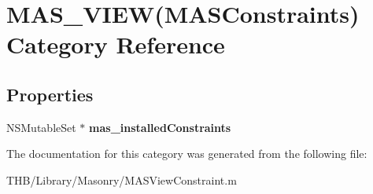 \hypertarget{category_m_a_s___v_i_e_w_07_m_a_s_constraints_08}{}\section{M\+A\+S\+\_\+\+V\+I\+EW(M\+A\+S\+Constraints) Category Reference}
\label{category_m_a_s___v_i_e_w_07_m_a_s_constraints_08}
\subsection*{Properties}
\begin{DoxyCompactItemize}
\item 
\mbox{\label{category_m_a_s___v_i_e_w_07_m_a_s_constraints_08_a29bbe10e9ba5b1f0294f7fe28c8ae144}} 
N\+S\+Mutable\+Set $\ast$ {\bfseries mas\+\_\+installed\+Constraints}
\end{DoxyCompactItemize}


The documentation for this category was generated from the following file\+:\begin{DoxyCompactItemize}
\item 
T\+H\+B/\+Library/\+Masonry/M\+A\+S\+View\+Constraint.\+m\end{DoxyCompactItemize}
